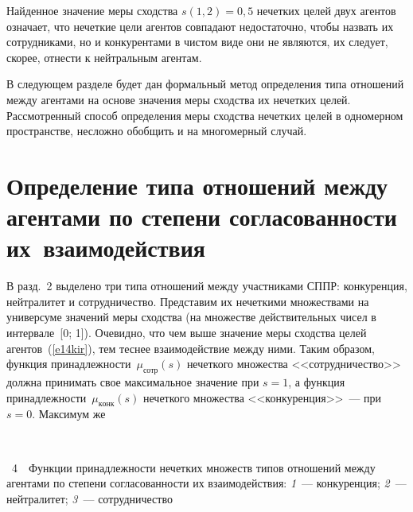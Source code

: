 \begin{multicols}{2}

  Найденное значение меры сходства $s(1,2)=0{,}5$ нечетких целей двух 
агентов означает, что нечеткие цели агентов совпадают недостаточно, чтобы 
назвать их сотрудниками, но и конкурентами в чис\-том виде они не являются, 
их следует, скорее, отнести к нейтральным агентам.
  
  В следующем разделе будет дан формальный метод определения типа 
отношений между агентами на основе значения меры сходства их нечетких 
целей. Рассмотренный способ определения меры сходства нечетких целей в 
одномерном пространстве, несложно обобщить и на многомерный случай.
 
 
\section{Определение типа отношений между агентами по степени 
согласованности их~взаимодействия}

  
  В разд.~2 выделено три типа отношений между участниками СППР: 
конкуренция, нейтралитет и сотрудничество. Представим их нечеткими 
множествами на универсуме значений меры сходства (на множестве 
действительных чисел в интервале~[0; 1]). Очевидно, что чем выше значение 
меры сходства целей агентов~(\ref{e14kir}), тем теснее взаимодействие между 
ними. Таким образом, функция принадлежности~$\mu_{\mathrm{сотр}}(s)$
нечеткого множества 
<<сотрудничество>> должна принимать свое максимальное значение 
при $s=1$, а функция принадлежности~$\mu_{\mathrm{конк}}(s)$ нечеткого мно\-жества 
<<конкуренция>>~--- при $s = 0$. Максимум же\linebreak 
  \begin{center} %
\vspace*{-6pt}
\mbox{%
\epsfxsize=66.912mm
}
\end{center}
\vspace*{4pt}
{{\figurename~4}\ \ \small{Функции принадлежности нечетких множеств типов отношений между агентами 
по степени согласованности их взаимодействия: \textit{1}~--- конкуренция; \textit{2}~--- 
нейтралитет; \textit{3}~--- сотрудничество}}
\vspace*{6pt}


\bigskip
\addtocounter{figure}{1}
  

\end{multicols}
